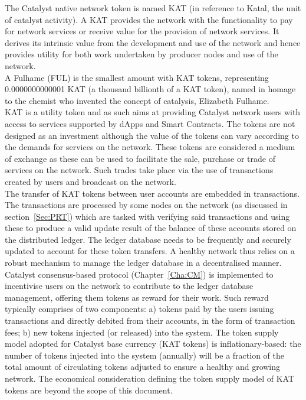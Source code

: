The Catalyst native network token is named KAT (in reference to Katal, the unit of catalyst activity). A KAT provides the network with the functionality to pay for network services or receive value for the provision of network services. It derives its intrinsic value from the development and use of the network and hence provides utility for both work undertaken by producer nodes and use of the network. \\

A Fulhame (FUL) is the smallest amount with KAT tokens, representing 0.0000000000001 KAT (a thousand billionth of a KAT token), named in homage to the chemist who invented the concept of catalysis, Elizabeth Fulhame.\\

KAT is a utility token and as such aims at providing Catalyst network users with access to services supported by dApps and Smart Contracts. The tokens are not designed as an investment although the value of the tokens can vary according to the demands for services on the network. These tokens are considered a medium of exchange as these can be used to facilitate the sale, purchase or trade of services on the network. Such trades take place via the use of transactions created by users and broadcast on the network. \\

The transfer of KAT tokens between user accounts are embedded in transactions. The transactions are processed by some nodes on the network (as discussed in section~\ref{Sec:PRT}) which are tasked with verifying said transactions and using these to produce a valid update result of the balance of these accounts stored on the distributed ledger. The ledger database needs to be frequently and securely updated to account for these token transfers. A healthy network thus relies on a robust mechanism to manage the ledger database in a decentralised manner. Catalyst consensus-based protocol (Chapter~\ref{Cha:CM}) is implemented to incentivise users on the network to contribute to the ledger database management, offering them tokens as reward for their work. Such reward typically comprises of two components: a) tokens paid by the users issuing transactions and directly debited from their accounts, in the form of transaction fees; b) new tokens injected (or released) into the system. The token supply model adopted for Catalyst base currency (KAT tokens) is inflationary-based: the number of tokens injected into the system (annually) will be a fraction of the total amount of circulating tokens adjusted to ensure a healthy and growing network. The economical consideration defining the token supply model of KAT tokens are beyond the scope of this document. 
